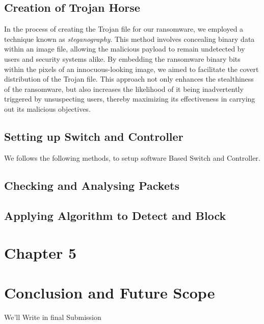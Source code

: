 \documentclass[12pt,letterpaper]{article}
\begin{document}
        

        \subsection{Creation of Trojan Horse}

        In the process of creating the Trojan file for our ransomware, we employed a technique known as \textit{steganography}. This method involves concealing binary data within an image file, allowing the malicious payload to remain undetected by users and security systems alike. By embedding the ransomware binary bits within the pixels of an innocuous-looking image, we aimed to facilitate the covert distribution of the Trojan file. This approach not only enhances the stealthiness of the ransomware, but also increases the likelihood of it being inadvertently triggered by unsuspecting users, thereby maximizing its effectiveness in carrying out its malicious objectives.

        \subsection{Setting up Switch and Controller}

        We follows the following methods, to setup software Based Switch and Controller.

        \subsection{Checking and Analysing Packets}

        \subsection{Applying Algorithm to Detect and Block}
        
\clearpage
    \newpage
    \section*{Chapter 5}
        \section{Conclusion and Future Scope}

            We'll Write in final Submission

\clearpage
\newpage
{}
    \printbibliography
\end{document}
